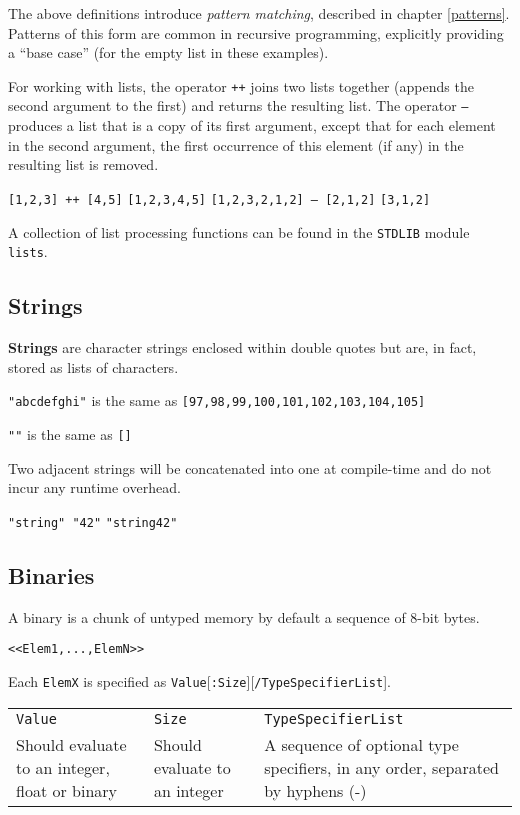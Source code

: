 The above definitions introduce \textit{pattern matching}, described in chapter \ref{patterns}.  Patterns of this form are common in recursive programming,
explicitly providing a ``base case'' (for the empty list in these examples).

For working with lists, the operator \texttt{++} joins two lists together (appends the second argument to the first) and
returns the resulting list.  The operator \texttt{--} produces a list that
is a copy of its first argument, except that for each element in
the second argument, the first occurrence of this element (if any) in the resulting list is
removed.

\texttt{[1,2,3] ++ [4,5]} \resultingin \texttt{[1,2,3,4,5]}
\texttt{[1,2,3,2,1,2] -- [2,1,2]} \resultingin \texttt{[3,1,2]}

A collection of list processing functions can be found in the
\texttt{STDLIB} module \texttt{lists}.


\subsection{Strings}
\label{datatypes:string}
\textbf{Strings} are character strings enclosed within double quotes
but are, in fact, stored as lists of characters.

\texttt{"abcdefghi"} is the same as \texttt{[97,98,99,100,101,102,103,104,105]}

\texttt{""} is the same as \texttt{[]}

Two adjacent strings will be concatenated into one at compile-time and
do not incur any runtime overhead.

\texttt{"string" "42"} \resultingin \texttt{"string42"}


\subsection{Binaries}
\label{datatypes:binary}
A binary is a chunk of untyped memory by default a sequence of 8-bit
bytes.

\texttt{<}\texttt{<Elem1,...,ElemN>}\texttt{>}

Each \texttt{ElemX} is specified as \texttt{Value}[\texttt{:Size}][\texttt{/TypeSpecifierList}].

\begin{center}
\begin{tabular}{|>{\raggedright}p{73pt}|>{\raggedright}p{81pt}|>{\raggedright}p{147pt}|}
\hline
\multicolumn{3}{|p{297pt}|}{{\large{}Element specification}}\tabularnewline
\hline
\texttt{Value} & \texttt{Size} & \texttt{TypeSpecifierList}\tabularnewline
\hline
Should evaluate to an integer, float or binary & Should
evaluate to an integer & A sequence of optional type specifiers, in any order,
separated by hyphens (-)\tabularnewline
\hline
\end{tabular}
\end{center}

